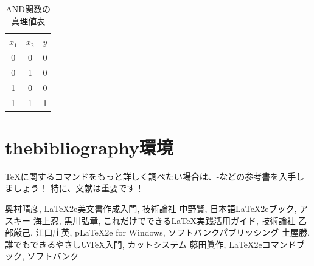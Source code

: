 \documentclass[12pt,a4j,twocolumn]{jarticle}
\begin{document}
\begin{table}[tb]
	\caption{AND関数の真理値表}
	\label{tb:and}
	\begin{center}
	\begin{tabular}{|c|c||c|}
		\hline
		$x_1$ & $x_2$ & $y$ \\ \hline \hline
		    0 &     0 &   0 \\ \hline
		    0 &     1 &   0 \\ \hline
		    1 &     0 &   0 \\ \hline
		    1 &     1 &   1 \\ \hline
	\end{tabular}
	\end{center}
\end{table}

\newpage

\section{thebibliography環境}

TeXに関するコマンドをもっと詳しく調べたい場合は、\cite{tex1}-\cite{tex6}などの参考書を入手しましょう！
特に、文献\cite{tex2,tex5}は重要です！

\begin{thebibliography}{9}
 奥村晴彦, LaTeX2e美文書作成入門, 技術論社
 中野賢, 日本語LaTeX2eブック, アスキー
 海上忍, 黒川弘章, これだけでできるLaTeX実践活用ガイド, 技術論社
 乙部厳己, 江口庄英, pLaTeX2e for Windows, ソフトバンクパブリッシング
 土屋勝, 誰でもできるやさしいTeX入門, カットシステム
 藤田眞作, LaTeX2eコマンドブック, ソフトバンク
\end{thebibliography}
\end{document}
